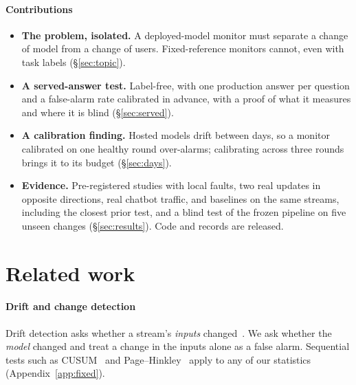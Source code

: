 \documentclass{article}
\begin{document}
\paragraph{Contributions}
\begin{itemize}[leftmargin=*,itemsep=1pt]
  \item \textbf{The problem, isolated.} A deployed-model monitor must separate a
  change of model from a change of users. Fixed-reference monitors cannot, even
  with task labels (\S\ref{sec:topic}).
  \item \textbf{A served-answer test.} Label-free, with one production answer per
  question and a false-alarm rate calibrated in advance, with a proof of what it
  measures and where it is blind (\S\ref{sec:served}).
  \item \textbf{A calibration finding.} Hosted models drift between days, so a
  monitor calibrated on one healthy round over-alarms; calibrating across three
  rounds brings it to its budget (\S\ref{sec:days}).
  \item \textbf{Evidence.} Pre-registered studies with local faults, two real
  updates in opposite directions, real chatbot traffic, and baselines on the same
  streams, including the closest prior test, and a blind test of the frozen
  pipeline on five unseen changes (\S\ref{sec:results}). Code and records are
  released.
\end{itemize}

\section{Related work}

\paragraph{Drift and change detection}
Drift detection asks whether a stream's \emph{inputs} changed~\citep{gama2014survey,
rabanser2019failing,lipton2018detecting}. We ask whether the \emph{model} changed
and treat a change in the inputs alone as a false alarm. Sequential tests such as
CUSUM~\citep{page1954continuous} and Page--Hinkley~\citep{hinkley1971inference}
apply to any of our statistics (Appendix~\ref{app:fixed}).
\end{document}
